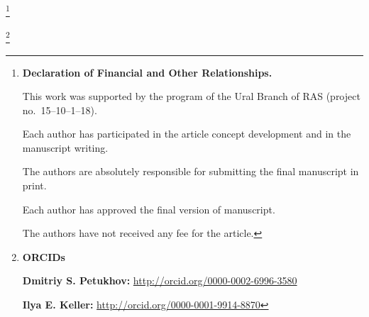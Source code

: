 \newpage



\makeentitle



\thanks{{\bf Declaration of Financial and Other Relationships.}

This work was supported by the program of the Ural Branch of RAS (project no.~15--10--1--18).

Each author has participated in the article concept development and in the manuscript writing.

The authors are absolutely responsible for submitting the final manuscript in print.

Each author has approved the final version of manuscript.

The authors have not received any fee for the article.

}



\pagebreak





\thanks{{\bf ORCIDs}



{\bf  Dmitriy S. Petukhov:}    \url{http://orcid.org/0000-0002-6996-3580}



{\bf Ilya E. Keller:}    \url{http://orcid.org/0000-0001-9914-8870}

}





\EngRef

